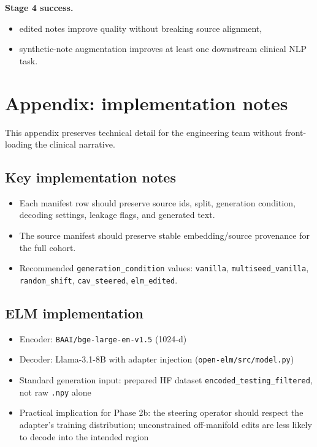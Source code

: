 \documentclass[11pt]{article}
\begin{document}
\textbf{Stage 4 success.}
\begin{itemize}[nosep]
  \item edited notes improve quality without breaking source alignment,
  \item synthetic-note augmentation improves at least one downstream clinical NLP task.
\end{itemize}

\section{Appendix: implementation notes}

\small
This appendix preserves technical detail for the engineering team without front-loading the clinical narrative.

\subsection{Key implementation notes}

\begin{itemize}[nosep]
  \item Each manifest row should preserve source ids, split, generation condition, decoding settings, leakage flags, and generated text.
  \item The source manifest should preserve stable embedding/source provenance for the full cohort.
  \item Recommended \texttt{generation\_condition} values: \texttt{vanilla}, \texttt{multiseed\_vanilla}, \texttt{random\_shift}, \texttt{cav\_steered}, \texttt{elm\_edited}.
\end{itemize}

\subsection{ELM implementation}

\begin{itemize}[nosep]
  \item Encoder: \texttt{BAAI/bge-large-en-v1.5} (1024-d)
  \item Decoder: Llama-3.1-8B with adapter injection (\texttt{open-elm/src/model.py})
  \item Standard generation input: prepared HF dataset \texttt{encoded\_testing\_filtered}, not raw \texttt{.npy} alone
  \item Practical implication for Phase 2b: the steering operator should respect the adapter's training distribution; unconstrained off-manifold edits are less likely to decode into the intended region
\end{itemize}
\end{document}
